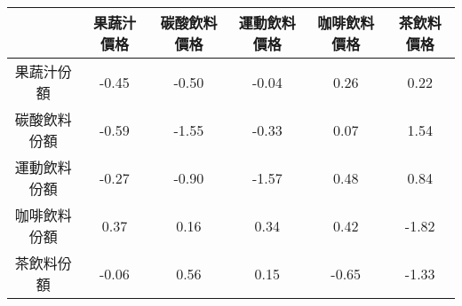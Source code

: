 \begin{tabular}{cccccc}
  \hline
 & 果蔬汁價格 & 碳酸飲料價格 & 運動飲料價格 & 咖啡飲料價格 & 茶飲料價格 \\ 
  \hline
果蔬汁份額 & -0.45 & -0.50 & -0.04 & 0.26 & 0.22 \\ 
  碳酸飲料份額 & -0.59 & -1.55 & -0.33 & 0.07 & 1.54 \\ 
  運動飲料份額 & -0.27 & -0.90 & -1.57 & 0.48 & 0.84 \\ 
  咖啡飲料份額 & 0.37 & 0.16 & 0.34 & 0.42 & -1.82 \\ 
  茶飲料份額 & -0.06 & 0.56 & 0.15 & -0.65 & -1.33 \\ 
   \hline
\end{tabular}
